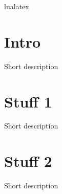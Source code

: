 \documentclass{article}
\begin{document}
						lualatex %

\section{Intro}
Short description

\section{Stuff 1}
Short description

\section{Stuff 2}
Short description
\end{document}
